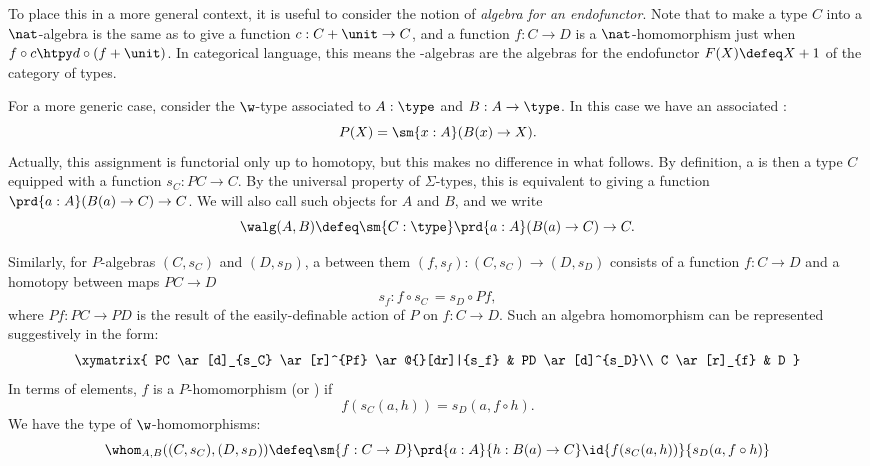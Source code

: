 To place this in a more general context, it is useful to consider the notion of \emph{algebra for an endofunctor}. 
Note that to make a type $C$ into a $\nat$-algebra is the same as to give a function $c:C+\unit\to C$, and a function $f:C\to D$ is a $\nat$-homomorphism just when $f \circ c \htpy d \circ (f+\unit)$.
In categorical language, this means the \nat-algebras are the algebras for the endofunctor $F(X)\defeq X+1$ of the category of types.

%
%
%
For a more generic case, consider the $\w$-type associated to $A : \type$ and $B : A \to \type$.
In this case we have an associated :
\begin{equation}
\label{eq:polyfunc}
P(X) = \sm{x : A} (B(x) \rightarrow X).
\end{equation}
Actually, this assignment is functorial only up to homotopy, but this makes no difference in what follows.
By definition, a 
%
%
is then a type $C$ equipped with a function $s_C :  PC \rightarrow C$.
By the universal property of $\Sigma$-types, this is equivalent to giving a function $\prd{a:A} (B(a) \to C) \to C$.
We will also call such objects 
%
for $A$ and $B$, and we write
\begin{equation*}
\walg(A,B) \defeq \sm {C : \type} \prd{a:A} (B(a) \to C) \to C.
\end{equation*}

Similarly, for $P$-algebras $(C,s_C)$ and $(D,s_D)$, a 
%
between them $(f, s_f) : (C, s_C) \rightarrow (D, s_D)$ consists of a function $f : C \rightarrow D$ and a homotopy between maps $PC \rightarrow D$
\[
s_f :  f \circ s_C \, = s_{D} \circ Pf,
\]
where $Pf : PC\rightarrow PD$ is the result of the easily-definable action of $P$ on $f: C \rightarrow D$. Such an algebra homomorphism can be represented suggestively in the form:
\[
\xymatrix{
 PC \ar[d]_{s_C} \ar[r]^{Pf}  \ar@{}[dr]|{s_f} &  PD \ar[d]^{s_D}\\
C \ar[r]_{f}   & D }
\]
In terms of elements, $f$ is a $P$-homomorphism (or ) if
%
%
\[f(s_C(a,h)) = s_D(a,f \circ h).\]
We have the type of $\w$-homomorphisms:
\begin{equation*}
  \whom_{A,B}((C, s_C),(D,s_D)) \defeq \sm{f : C \to D} \prd{a:A}{h:B(a)\to C} \id{f(s_C(a,h))}{s_D(a, f\circ h)}
\end{equation*}

